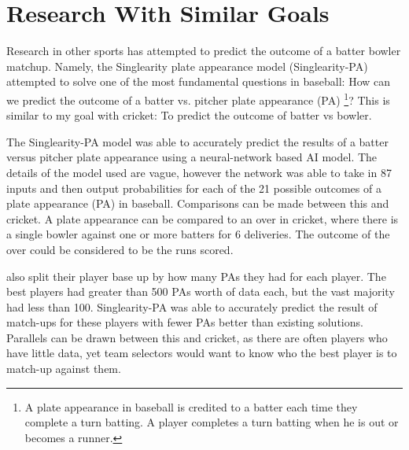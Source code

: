 \documentclass[12pt,a4paper]{report}
\theoremstyle{definition}
\begin{document}
%
%

\section{Research With Similar Goals}

Research in other sports has attempted to predict the outcome of a batter bowler matchup.
Namely, the Singlearity plate appearance model (Singlearity-PA) \citep{silver2021baseball} attempted to solve one of the most fundamental questions in baseball:	 How can we	predict the outcome of a batter	vs. pitcher plate appearance (PA) \footnote{A plate appearance in baseball is credited to a batter each time they complete a turn batting. A player completes a turn batting when he is out or becomes a runner.}? 
This is similar to my goal with cricket: To predict the outcome of batter vs bowler.

The Singlearity-PA model \citep{silver2021baseball} was able to accurately predict the results of a batter versus pitcher plate appearance using a neural-network based AI model. 
The details of the model used are vague, however the network was able to take in 87 inputs and then output probabilities for each of the 21 possible outcomes of a plate appearance (PA) in baseball. 
Comparisons can be made between this and cricket. 
A plate appearance can be compared to an over in cricket, where there is a single bowler against one or more batters for 6 deliveries. 
The outcome of the over could be considered to be the runs scored. 

\citet{silver2021baseball} also split their player base up by how many PAs they had for each player. 
The best players had greater than 500 PAs worth of data each, but the vast majority had less than 100. 
Singlearity-PA was able to accurately predict the result of match-ups for these players with fewer PAs better than existing solutions. 
Parallels can be drawn between this and cricket, as there are often players who have little data, yet team selectors would want to know who the best player is to match-up against them.
\end{document}
